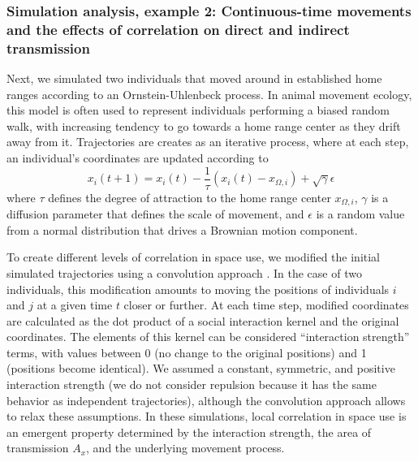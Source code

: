 \documentclass[letterpaper]{article}
\begin{document}
\subsubsection*{Simulation analysis, example 2: Continuous-time movements and the effects of correlation on direct and indirect transmission}

Next, we simulated two individuals that moved around in established home ranges according to an Ornstein-Uhlenbeck process. In animal movement ecology, this model is often used to represent individuals performing a biased random walk, with increasing tendency to go towards a home range center as they drift away from it. Trajectories are creates as an iterative process, where at each step, an individual's coordinates are updated according to 
\begin{equation}
	x_i(t+1)=x_i(t)-\frac{1}{\tau}(x_i(t)-x_{\Omega,i})+\sqrt{\gamma}\epsilon
\end{equation}
where $\tau$ defines the degree of attraction to the home range center $x_{\Omega,i}$, $\gamma$ is a diffusion parameter that defines the scale of movement, and $\epsilon$ is a random value from a normal distribution that drives a Brownian motion component. 

To create different levels of correlation in space use, we modified the initial simulated trajectories using a convolution approach \citep{Scharf2018}. In the case of two individuals, this modification amounts to moving the positions of individuals $i$ and $j$ at a given time $t$ closer or further. At each time step, modified coordinates are calculated as the dot product of a social interaction kernel and the original coordinates. The elements of this kernel can be considered ``interaction strength'' terms, with values between 0 (no change to the original positions) and 1 (positions become identical). We assumed a constant, symmetric, and positive interaction strength (we do not consider repulsion because it has the same behavior as independent trajectories), although the convolution approach allows to relax these assumptions. In these simulations, local correlation in space use is an emergent property determined by the interaction strength, the area of transmission $A_x$, and the underlying movement process.  
\end{document}
